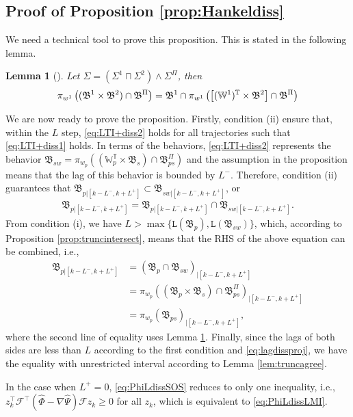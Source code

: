 \documentclass[11pt,print,draftcls,onecolumn,romanappendices]{ieeecolor}
\newtheorem{lem}[thm]{Lemma}
\newcommand{\W}{\mathbb{W}}
\newcommand{\T}{\mathbb{T}}
\newcommand{\lag}[1]{\mathtt{L}\left(#1\right)}
\newcommand{\proj}[2]{\pi_{#1}\left(#2\right)}
\newcommand{\revise}[1]{{\color{black} #1}}
\newcommand{\B}{\mathfrak{B}}
\newcommand{\F}{\mathcal{F}}
\newcommand{\bint}[1]{{|[#1]}}
\begin{document}
\subsection{Proof of Proposition \ref{prop:Hankeldiss}}\label{proofprop:Hankeldiss}
We need a technical tool to prove this proposition. This is stated in the following lemma.
\begin{lem}[\cite{Yan:2021}]\label{lem:projinout}
	Let $\Sigma=(\Sigma^1\sqcap\Sigma^2)\wedge\Sigma^\Pi$, then
	\begin{equation*}
		\proj{w^1}{(\B^1\times\B^2)\cap\B^\Pi}=\B^\revise{1}\cap\proj{w^1}{\left[(\W^1)^\T\times\B^2\right]\cap\B^\Pi}
	\end{equation*}
\end{lem}

We are now ready to prove the proposition. Firstly, condition (ii) ensure that, within the $L$ step, \eqref{eq:LTI+diss2} holds for all trajectories such that \eqref{eq:LTI+diss1} holds. In terms of the behaviors, \eqref{eq:LTI+diss2} represents the behavior $\B_{sw}=\proj{w_p}{(\W_p^\T\times\B_s)\cap\B_{ps}^\Pi}$ and the assumption in the proposition means that the lag of this behavior is bounded by $L^-$. Therefore, condition (ii) guarantees that $\B_{p\bint{k-L^-,k+L^+}}\subset\B_{sw\bint{k-L^-,k+L^+}}$, or
\begin{align*}
	\B_{p\bint{k-L^-,k+L^+}}=\B_{p\bint{k-L^-,k+L^+}}\cap\B_{sw\bint{k-L^-,k+L^+}}.
\end{align*}
From condition (i), we have $L>\max\{\lag{\B_p},\lag{\B_{sw}}\}$, which, according to Proposition \ref{prop:truncintersect}, means that the RHS of the above equation can be combined, i.e.,
\begin{align*}
	\B_{p\bint{k-L^-,k+L^+}}&=(\B_p\cap\B_{sw})_\bint{k-L^-,k+L^+}\\
	&=\proj{w_p}{(\B_p\times\B_s)\cap\B_{ps}^\Pi}_\bint{k-L^-,k+L^+}\\
	&=\proj{w_p}{\B_{ps}}_\bint{k-L^-,k+L^+},
\end{align*}
where the second line of equality uses Lemma \ref{lem:projinout}. Finally, since the lags of both sides are less than $L$ according to the first condition and \eqref{eq:lagdissproj}, we have the equality with unrestricted interval according to Lemma \ref{lem:truncagree}. 

\revise{In the case when $L^+=0$, \eqref{eq:PhiLdissSOS} reduces to only one inequality, i.e., $z_k^\top\F^\top (\widehat{\Phi}-\nabla\widehat{\Psi})\F z_k\geq0$ for all $z_k$, which is equivalent to \eqref{eq:PhiLdissLMI}.}
\end{document}
